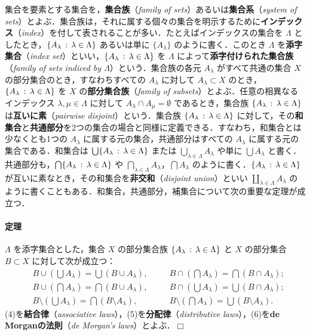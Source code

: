 \documentclass[pandoc,base=10pt,b5j,precisetext]{bxjsarticle}
\let\oldparagraph\paragraph
\renewcommand{\paragraph}[1]{\oldparagraph{#1}\mbox{}}
\begin{document}
集合を要素とする集合を，\textbf{集合族}（\emph{family of
sets}）あるいは\textbf{集合系}（\emph{system of
sets}）とよぶ．集合族は，それに属する個々の集合を明示するために\textbf{インデックス}（\emph{index}）を付して表されることが多い．たとえばインデックスの集合を
\(\Lambda\) としたとき，\(\{ A_\lambda \,:\, \lambda \in \Lambda \}\)
あるいは単に \(\{ A_\lambda \}\) のように書く．このとき \(\Lambda\)
を\textbf{添字集合}（\emph{index
set}）といい，\(\{ A_\lambda \,:\, \lambda \in \Lambda \}\) を
\(\Lambda\) によって\textbf{添字付けられた集合族}（\emph{family of sets
indiced by \(\Lambda\)}）という．集合族の各元 \(A_\lambda\)
がすべて共通の集合 \(X\) の部分集合のとき，すなわちすべての
\(A_\lambda\) に対して \(A_\lambda \subset X\)
のとき，\(\{ A_\lambda \,:\, \lambda \in \Lambda \}\) を \(X\)
の\textbf{部分集合族}（\emph{family of
subsets}）とよぶ．任意の相異なるインデックス
\(\lambda, \mu \in \Lambda\) に対して
\(A_\lambda \cap A_\mu = \emptyset\) であるとき，集合族
\(\{ A_\lambda \,:\, \lambda \in \Lambda \}\)
は\textbf{互いに素}（\emph{pairwise disjoint}）という．集合族
\(\{ A_\lambda \,:\, \lambda \in \Lambda \}\)
に対して，その\textbf{和集合}と\textbf{共通部分}を2つの集合の場合と同様に定義できる．すなわち，和集合とは少なくとも1つの
\(A_\lambda\) に属する元の集合，共通部分はすべての \(A_\lambda\)
に属する元の集合である．和集合は
\(\bigcup \{ A_\lambda \,:\, \lambda \in \Lambda \}\) または
\(\bigcup_{\lambda \in \Lambda} A_\lambda\) や単に \(\bigcup A_\lambda\)
と書く．共通部分も，\(\bigcap \{ A_\lambda \,:\, \lambda \in \Lambda \}\)
や \(\bigcap_{\lambda \in \Lambda} A_\lambda\)，\(\bigcap A_\lambda\)
のように書く．\(\{ A_\lambda \,:\, \lambda \in \Lambda \}\)
が互いに素なとき，その和集合を\textbf{非交和}（\emph{disjoint
union}）といい \(\coprod_{\lambda \in \Lambda} A_\lambda\)
のように書くこともある．和集合，共通部分，補集合について次の重要な定理が成立つ．

\hypertarget{properties-of-sets}{%
\paragraph{定理}\label{properties-of-sets}}

\(\Lambda\) を添字集合とした，集合 \(X\) の部分集合族
\(\{ A_\lambda \,:\, \lambda \in \Lambda \}\) と \(X\) の部分集合
\(B \subset X\) に対して次が成立つ： \begin{align}
&B \cup \left( \bigcup A_\lambda \right) = \bigcup ( B \cup A_\lambda ), &\quad & B \cap \left( \bigcap A_\lambda \right) = \bigcap ( B \cap A_\lambda );\\
&B \cup \left( \bigcap A_\lambda \right) = \bigcap ( B \cup A_\lambda ), &\quad & B \cap \left( \bigcup A_\lambda \right) = \bigcup ( B \cap A_\lambda );\\
&B \setminus \left( \bigcup A_\lambda \right) = \bigcap ( B \setminus A_\lambda ), &\quad & B \setminus \left( \bigcap A_\lambda \right) = \bigcup ( B \setminus A_\lambda ).
\end{align} (4)を\textbf{結合律}（\emph{associative
laws}），(5)を\textbf{分配律}（\emph{distributive
laws}），(6)を\textbf{de Morganの法則}（\emph{de Morgan's
laws}）とよぶ．\(\Box\)
\end{document}
